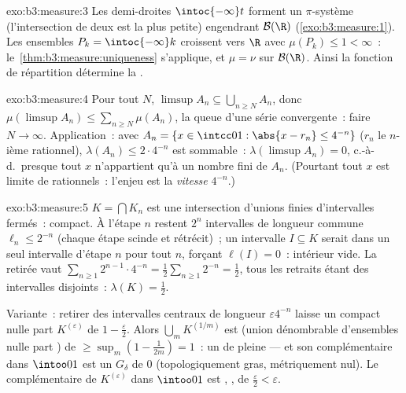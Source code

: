 \begin{solution}{exo:b3:measure:3}
Les demi-droites $\intoc{-\infty}t$ forment un $\pi$-système
(l'intersection de deux est la plus petite) engendrant
$\mathcal B(\R)$ (\cref{exo:b3:measure:1}). Les ensembles
$P_k = \intoc{-\infty}k$ croissent vers $\R$ avec $\mu(P_k)
\leq 1 < \infty$~: le~\cref{thm:b3:measure:uniqueness}
s'applique, et $\mu = \nu$ sur $\mathcal B(\R)$. Ainsi la
fonction de répartition détermine la .
\end{solution}

\begin{solution}{exo:b3:measure:4}
Pour tout $N$, $\limsup A_n \subseteq \bigcup_{n \geq
N}A_n$, donc $\mu(\limsup A_n) \leq \sum_{n\geq
N}\mu(A_n)$, la queue d'une série convergente~: faire $N
\to \infty$. Application~: avec $A_n = \{x \in \intcc01 :
\abs{x - r_n} \leq 4^{-n}\}$ ($r_n$ le $n$-ième rationnel),
$\lambda(A_n) \leq 2\cdot4^{-n}$ est sommable~:
$\lambda(\limsup A_n) = 0$, c.-à-d.\ presque tout $x$
n'appartient qu'à un nombre fini de $A_n$. (Pourtant tout $x$
est limite de rationnels~: l'enjeu est la \emph{vitesse}
$4^{-n}$.)
\end{solution}

\begin{solution}{exo:b3:measure:5}
$K = \bigcap K_n$ est une intersection d'unions finies
d'intervalles fermés~: compact. À l'étape $n$ restent $2^n$
intervalles de longueur commune $\ell_n \leq 2^{-n}$ (chaque
étape scinde et rétrécit)~; un intervalle $I \subseteq K$
serait  dans un seul intervalle d'étape $n$ pour tout
$n$, forçant $\ell(I) = 0$~: intérieur vide. La 
retirée vaut $\sum_{n\geq1}2^{n-1}\cdot 4^{-n} =
\frac12\sum_{n\geq1}2^{-n} = \frac12$, tous les retraits
étant des intervalles  disjoints~: $\lambda(K) =
\frac12$.

Variante~: retirer des intervalles centraux de longueur
$\varepsilon 4^{-n}$ laisse un compact nulle part 
$K^{(\varepsilon)}$ de  $1 - \frac\varepsilon2$. Alors
$\bigcup_m K^{(1/m)}$ est  (union dénombrable
d'ensembles nulle part ) de  $\geq \sup_m(1 -
\frac1{2m}) = 1$~: un  de  pleine ---
et son complémentaire dans $\intoo01$ est un $G_\delta$ 
de  $0$ (topologiquement gras, métriquement nul). Le
complémentaire de $K^{(\varepsilon)}$ dans $\intoo01$ est
, , de  $\frac\varepsilon2 < \varepsilon$.
\end{solution}

